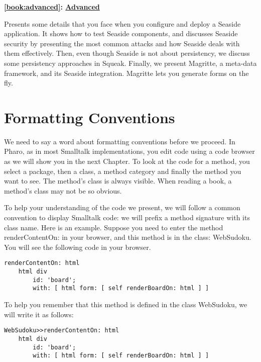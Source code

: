 \documentclass[a4paper,10pt,twoside]{book}
\newcommand{\ct}[1]{{\small\ttfamily\textup{#1}}}
\begin{document}
\begin{list}{}{}
\item\hspace{-\labelwidth}\textbf{ \autoref{book:advanced}: \hyperref[book:advanced]{Advanced}}
\item  Presents some details that you face when you configure and deploy a Seaside application. It shows how to test Seaside components, and discusses Seaside security by presenting the most common attacks and how Seaside deals with them effectively. Then, even though Seaside is not about persistency, we discuss some persistency approaches in Squeak. Finally, we present Magritte, a meta-data framework, and its Seaside integration. Magritte lets you generate forms on the fly.
\end{list}

\section{Formatting Conventions}
\label{book:introduction:formattingconventions}

We need to say a word about formatting conventions before we proceed. In Pharo, as in most Smalltalk implementations, you edit code using a code browser as we will show you in the next Chapter. To look at the code for a method, you select a package, then a class, a method category and finally the method you want to see. The method's class is always visible. When reading a book, a method's class may not be so obvious.

To help your understanding of the code we present, we will follow a common convention to display Smalltalk code: we will prefix a method signature with its class name. Here is an example. Suppose you need to enter the method \ct{renderContentOn:} in your browser, and this method is in the class: \ct{WebSudoku}. You will see the following code in your browser.

\begin{lstlisting}
renderContentOn: html
    html div
        id: 'board';
        with: [ html form: [ self renderBoardOn: html ] ]
\end{lstlisting}

To help you remember that this method is defined in the class \ct{WebSudoku}, we will write it as follows:

\begin{lstlisting}
WebSudoku>>renderContentOn: html
    html div
        id: 'board';
        with: [ html form: [ self renderBoardOn: html ] ]
\end{lstlisting}
\end{document}
